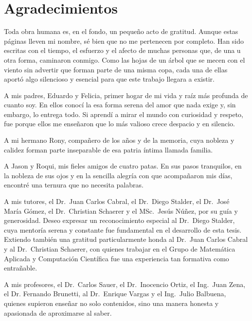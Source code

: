 \chapter*{Agradecimientos}

\hspace{12pt}

\begin{flushright}

Toda obra humana es, en el fondo, un pequeño acto de gratitud. Aunque estas páginas lleven mi nombre, sé bien que no me pertenecen por completo. Han sido escritas con el tiempo, el esfuerzo y el afecto de muchas personas que, de una u otra forma, caminaron conmigo. Como las hojas de un árbol que se mecen con el viento sin advertir que forman parte de una misma copa, cada una de ellas aportó algo silencioso y esencial para que este trabajo llegara a existir.

A mis padres, Eduardo y Felicia, primer hogar de mi vida y raíz más profunda de cuanto soy. En ellos conocí la esa forma serena del amor que nada exige y, sin embargo, lo entrega todo. Si aprendí a mirar el mundo con curiosidad y respeto, fue porque ellos me enseñaron que lo más valioso crece despacio y en silencio.

A mi hermano Rony, compañero de los años y de la memoria, cuya nobleza y calidez forman parte inseparable de esa patria íntima llamada familia.

A Jason y Roqui, mis fieles amigos de cuatro patas. En sus pasos tranquilos, en la nobleza de sus ojos y en la sencilla alegría con que acompañaron mis días, encontré una ternura que no necesita palabras. 

A mis tutores, el Dr.~Juan Carlos Cabral, el Dr.~Diego Stalder, el Dr.~José María Gómez, el Dr.~Christian Schaerer y el MSc.~Jesús Núñez, por su guía y generosidad. Deseo expresar un reconocimiento especial al Dr.~Diego Stalder, cuya mentoría serena y constante fue fundamental en el desarrollo de esta tesis. Extiendo también una gratitud particularmente honda al Dr.~Juan Carlos Cabral y al Dr.~Christian Schaerer, con quienes trabajar en el Grupo de Matemática Aplicada y Computación Científica fue una experiencia tan formativa como entrañable.

A mis profesores, el Dr.~Carlos Sauer, el Dr.~Inocencio Ortiz, el Ing.~Juan Zena, el Dr. Fernando Brunetti, al Dr.~Enrique Vargas  y el Ing.~Julio Balbuena, quienes supieron enseñar no solo contenidos, sino una manera honesta y apasionada de aproximarse al saber. 


\end{flushright}
